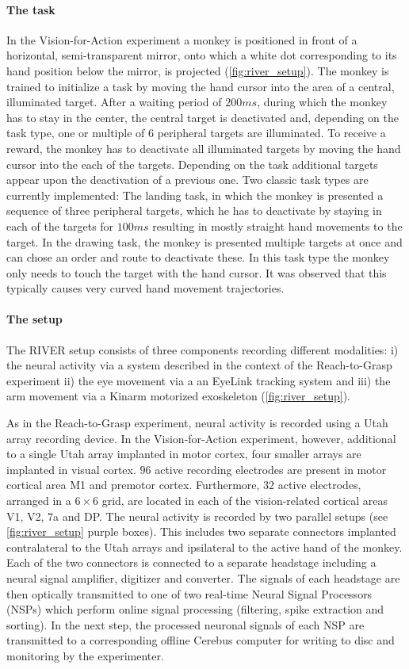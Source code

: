 \paragraph{The task}
In the Vision-for-Action experiment a monkey is positioned in front of a horizontal, semi-transparent mirror, onto which a white dot corresponding to its hand position below the mirror, is projected (\cref{fig:river_setup}). The monkey is trained to initialize a task by moving the hand cursor into the area of a central, illuminated target. After a waiting period of $200ms$, during which the monkey has to stay in the center, the central target is deactivated and, depending on the task type, one or multiple of 6 peripheral targets are illuminated. To receive a reward, the monkey has to deactivate all illuminated targets by moving the hand cursor into the each of the targets. Depending on the task additional targets appear upon the deactivation of a previous one. Two classic task types are currently implemented: The landing task, in which the monkey is presented a sequence of three peripheral targets, which he has to deactivate by staying in each of the targets for $100ms$ resulting in mostly straight hand movements to the target. In the drawing task, the monkey is presented multiple targets at once and can chose an order and route to deactivate these. In this task type the monkey only needs to touch the target with the hand cursor. It was observed that this typically causes very curved hand movement trajectories.


\paragraph{The setup}
The RIVER setup consists of three components recording different modalities: i) the neural activity via a  system described in the context of the Reach-to-Grasp experiment ii) the eye movement via a an EyeLink tracking system and iii) the arm movement via a Kinarm motorized exoskeleton (\cref{fig:river_setup}).

As in the Reach-to-Grasp experiment, neural activity is recorded using a Utah array recording device. In the Vision-for-Action experiment, however, additional to a single Utah array implanted in motor cortex, four smaller arrays are implanted in visual cortex.  $96$ active recording electrodes are present in motor cortical area M1 and premotor cortex. Furthermore, $32$ active electrodes, arranged in a $6\times6$ grid, are located in each of the vision-related cortical areas V1, V2, 7a and DP. The neural activity is recorded by two parallel setups (see \cref{fig:river_setup} purple boxes). This includes two separate connectors implanted contralateral to the Utah arrays and ipsilateral to the active hand of the monkey. Each of the two connectors is connected to a separate headstage including a neural signal amplifier, digitizer and converter. The signals of each headstage are then optically transmitted to one of two real-time Neural Signal Processors (NSPs) which perform online signal processing (filtering, spike extraction and sorting). In the next step, the processed neuronal signals of each NSP are transmitted to a corresponding offline Cerebus computer for writing to disc and monitoring by the experimenter.

